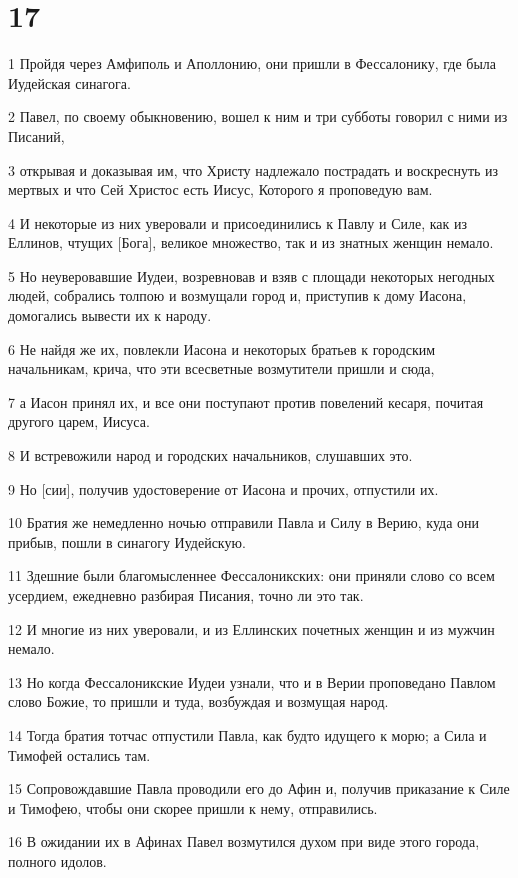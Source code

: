 \chapter{17}

\par 1 Пройдя через Амфиполь и Аполлонию, они пришли в Фессалонику, где была Иудейская синагога.
\par 2 Павел, по своему обыкновению, вошел к ним и три субботы говорил с ними из Писаний,
\par 3 открывая и доказывая им, что Христу надлежало пострадать и воскреснуть из мертвых и что Сей Христос есть Иисус, Которого я проповедую вам.
\par 4 И некоторые из них уверовали и присоединились к Павлу и Силе, как из Еллинов, чтущих [Бога], великое множество, так и из знатных женщин немало.
\par 5 Но неуверовавшие Иудеи, возревновав и взяв с площади некоторых негодных людей, собрались толпою и возмущали город и, приступив к дому Иасона, домогались вывести их к народу.
\par 6 Не найдя же их, повлекли Иасона и некоторых братьев к городским начальникам, крича, что эти всесветные возмутители пришли и сюда,
\par 7 а Иасон принял их, и все они поступают против повелений кесаря, почитая другого царем, Иисуса.
\par 8 И встревожили народ и городских начальников, слушавших это.
\par 9 Но [сии], получив удостоверение от Иасона и прочих, отпустили их.
\par 10 Братия же немедленно ночью отправили Павла и Силу в Верию, куда они прибыв, пошли в синагогу Иудейскую.
\par 11 Здешние были благомысленнее Фессалоникских: они приняли слово со всем усердием, ежедневно разбирая Писания, точно ли это так.
\par 12 И многие из них уверовали, и из Еллинских почетных женщин и из мужчин немало.
\par 13 Но когда Фессалоникские Иудеи узнали, что и в Верии проповедано Павлом слово Божие, то пришли и туда, возбуждая и возмущая народ.
\par 14 Тогда братия тотчас отпустили Павла, как будто идущего к морю; а Сила и Тимофей остались там.
\par 15 Сопровождавшие Павла проводили его до Афин и, получив приказание к Силе и Тимофею, чтобы они скорее пришли к нему, отправились.
\par 16 В ожидании их в Афинах Павел возмутился духом при виде этого города, полного идолов.
